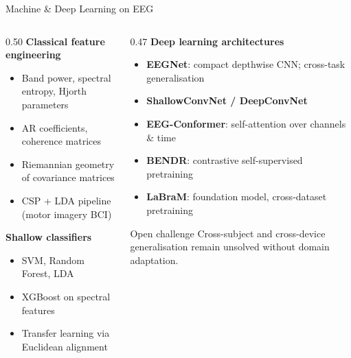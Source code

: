 

\begin{frame}{Machine \& Deep Learning on EEG}
  \begin{columns}[T]
    \begin{column}{0.50\textwidth}
      \textbf{Classical feature engineering}
      \begin{itemize}
        \item Band power, spectral entropy, Hjorth parameters
        \item AR coefficients, coherence matrices
        \item Riemannian geometry of covariance matrices \cite{Barachant2012}
        \item CSP + LDA pipeline (motor imagery BCI)
      \end{itemize}
      \vspace{0.3em}
      \textbf{Shallow classifiers}
      \begin{itemize}
        \item SVM, Random Forest, LDA
        \item XGBoost on spectral features
        \item Transfer learning via Euclidean alignment
      \end{itemize}
    \end{column}
    \begin{column}{0.47\textwidth}
      \textbf{Deep learning architectures}
      \begin{itemize}
        \item \textbf{EEGNet}: compact depthwise CNN; cross-task
          generalisation \cite{Lawhern2018}
        \item \textbf{ShallowConvNet / DeepConvNet} \cite{Schirrmeister2017}
        \item \textbf{EEG-Conformer}: self-attention over channels \& time \cite{Song2022}
        \item \textbf{BENDR}: contrastive self-supervised pretraining \cite{Kostas2022}
        \item \textbf{LaBraM}: foundation model, cross-dataset pretraining \cite{Jiang2024}
      \end{itemize}
      \vspace{0.2em}
      \begin{block}{Open challenge}
        \small Cross-subject and cross-device generalisation
        remain unsolved without domain adaptation.
      \end{block}
    \end{column}
  \end{columns}
\end{frame}
